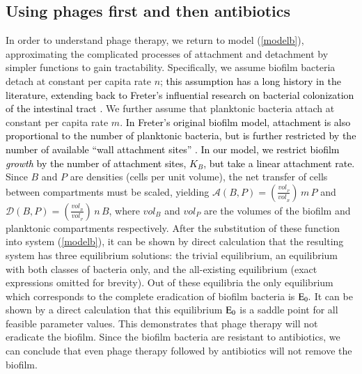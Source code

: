 \subsection{Using phages first and then antibiotics}
In order to understand phage therapy, we return to model (\ref{modelb}), approximating the complicated processes of attachment and detachment by simpler functions to gain tractability. Specifically, we assume biofilm bacteria detach at constant per capita rate $n$; \textcolor{black}{this
assumption has a long history in the literature, extending back to Freter's influential research on bacterial colonization of the intestinal tract \citep{freter_survival_1983,jones_freter_2003}.}  We further assume that planktonic bacteria attach at constant per capita rate $m$. \textcolor{black}{In Freter's original biofilm model, attachment is also proportional to the number of planktonic bacteria, but is further restricted by the number of available ``wall attachment sites'' \citep{freter_survival_1983}.  In our model, we restrict biofilm \emph{growth} by the number of attachment sites, $K_B$, but take a linear
attachment rate.} Since $B$ and $P$ are densities (cells per unit volume), the net transfer of cells between compartments must be scaled, yielding  $\mathcal{A}(B,P) = \left(\frac{vol_ {_{P}}}{vol_{_{B}}}\right)\, m\, P$ and $\mathcal{D}(B,P)=\left(\frac{vol_ {_{B}}}{vol_{_{P}}}\right)\, n\,B$, where $vol_B$  and $vol_P$ are the volumes of the biofilm and planktonic compartments respectively.  After the substitution of these function into system (\ref{modelb}), it can be shown by direct calculation that the resulting system has three equilibrium solutions: the trivial equilibrium, an equilibrium with both classes of bacteria only, and the all-existing equilibrium (exact expressions omitted for brevity).
Out of these equilibria the only equilibrium which corresponds to the complete eradication of biofilm bacteria is $\rm E_0.$ It can be shown by a direct calculation that this equilibrium $\rm E_0$ is a saddle point for all feasible parameter values. This demonstrates that phage therapy will not eradicate the biofilm.  Since the biofilm bacteria are resistant to antibiotics, we can conclude that even phage therapy followed by antibiotics will not remove the biofilm.

